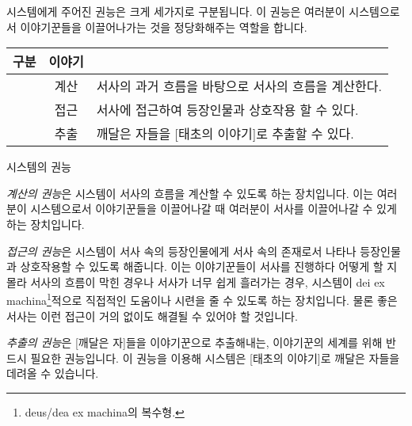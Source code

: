 \documentclass{report}
\begin{document}
	\bigskip
	
	시스템에게 주어진 권능은 크게 세가지로 구분됩니다. 이 권능은 여러분이 시스템으로서 이야기꾼들을 이끌어나가는 것을 정당화해주는 역할을 합니다.
	
	\smallskip
	
	\begin{minipage}{\textwidth}
		\begin{tabularx}{\textwidth}{c|c|X}
			\hline
			\textbf{구분} & \textbf{이야기} & \makecell{\centering\textbf{설명}} \\ \hline \hline
			[권능:시스템] & 계산\index{계산} & 서사의 과거 흐름을 바탕으로 서사의 흐름을 계산한다. \\ \hline
			[권능:시스템] & 접근\index{접근} & 서사에 접근하여 등장인물과 상호작용 할 수 있다. \\ \hline
			[권능:시스템] & 추출\index{추출} & 깨달은 자들을 [태초의 이야기]로 추출할 수 있다. \\ \hline
		\end{tabularx}
		
		\smallskip
		
		\begin{tightcenter}
			시스템의 권능
		\end{tightcenter}
	\end{minipage}
	
	\bigskip
	
	\emph{계산의 권능}은 시스템이 서사의 흐름을 계산할 수 있도록 하는 장치입니다. 이는 여러분이 시스템으로서 이야기꾼들을 이끌어나갈 때 여러분이 서사를 이끌어나갈 수 있게 하는 장치입니다.
	
	\smallskip
	
	\emph{접근의 권능}은 시스템이 서사 속의 등장인물에게 서사 속의 존재로서 나타나 등장인물과 상호작용할 수 있도록 해줍니다. 이는 이야기꾼들이 서사를 진행하다 어떻게 할 지 몰라 서사의 흐름이 막힌 경우나 서사가 너무 쉽게 흘러가는 경우, 시스템이 dei ex machina\footnote{deus/dea ex machina의 복수형.}적으로 직접적인 도움이나 시련을 줄 수 있도록 하는 장치입니다. 물론 좋은 서사는 이런 접근이 거의 없이도 해결될 수 있어야 할 것입니다.
	
	\smallskip
	
	\emph{추출의 권능}은 [깨달은 자]들을 이야기꾼으로 추출해내는, 이야기꾼의 세계를 위해 반드시 필요한 권능입니다. 이 권능을 이용해 시스템은 [태초의 이야기]로 깨달은 자들을 데려올 수 있습니다.
\end{document}
